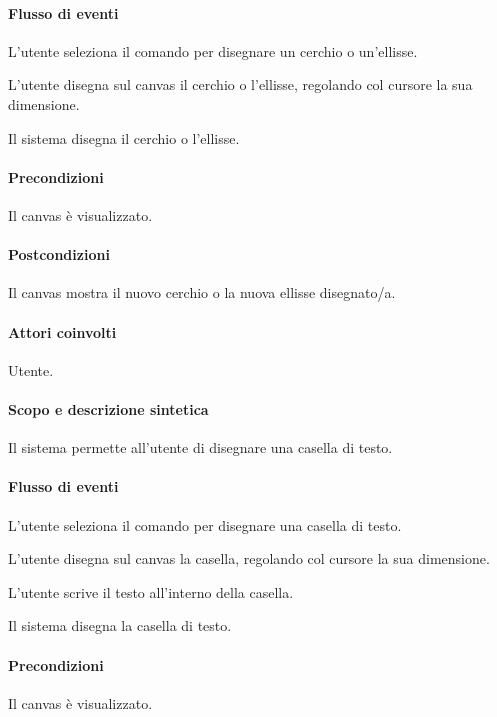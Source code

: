 \paragraph{Flusso di eventi}
\begin{elenconumerato}[\textbf{}]{\subsubsecindent}
\item L'utente seleziona il comando per disegnare un cerchio o un'ellisse.
\item L'utente disegna sul canvas il cerchio o l'ellisse, regolando col cursore la sua dimensione.
\item Il sistema disegna il cerchio o l'ellisse.
\end{elenconumerato}
\paragraph{Precondizioni} Il canvas \`e visualizzato.
\paragraph{Postcondizioni} Il canvas mostra il nuovo cerchio o la nuova ellisse disegnato/a.

\paragraph{Attori coinvolti} Utente.
\paragraph{Scopo e descrizione sintetica} 
Il sistema permette all'utente di disegnare una casella di testo.
\paragraph{Flusso di eventi}
\begin{elenconumerato}[\textbf{}]{\subsubsecindent}
\item L'utente seleziona il comando per disegnare una casella di testo.
\item L'utente disegna sul canvas la casella, regolando col cursore la sua dimensione.
\item L'utente scrive il testo all'interno della casella.
\item Il sistema disegna la casella di testo.
\end{elenconumerato}
\paragraph{Precondizioni} Il canvas \`e visualizzato.

